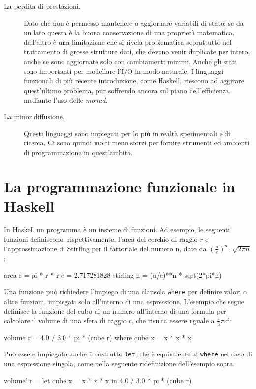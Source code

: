 \begin{description}
    \item[La perdita di prestazioni.] Dato che non \`e permesso 
    mantenere o aggiornare variabili di stato; se da un lato questa \`e la 
    buona conservazione di una propriet\`a matematica, dall'altro \`e una 
    limitazione che si rivela problematica soprattutto nel trattamento di 
    grosse strutture dati, che devono venir duplicate per intero, anche se 
    sono aggiornate solo con cambiamenti minimi. Anche gli stati sono 
    importanti per modellare l'I/O in modo naturale. I linguaggi funzionali di 
    pi\`u recente introduzione, come Haskell, riescono ad aggirare 
    quest'ultimo problema, pur soffrendo ancora sul piano dell'efficienza, mediante l'uso delle \emph{monad}.

    \item[La minor diffusione.] Questi linguaggi sono impiegati per lo pi\`u in realt\`a sperimentali e di 
    ricerca. Ci sono quindi molti meno sforzi per fornire strumenti ed ambienti di 
    programmazione in quest'ambito.
\end{description}

\section{La programmazione funzionale in Haskell}

In Haskell un programma \`e un insieme di funzioni. Ad esempio, le 
seguenti funzioni definiscono, rispettivamente, l'area del cerchio di 
raggio $r$ e l'approssimazione di Stirling per il fattoriale del numero 
n, dato da $(\frac{n}{e})^{n}\cdot\sqrt{2\pi n}$:
\begin{haskellCode}
area r     = pi * r * r
e          = 2.717281828
stirling n = (n/e)**n * sqrt(2*pi*n)
\end{haskellCode}



Una funzione pu\`o richiedere l'impiego di una clausola \verb"where" per 
definire valori o altre funzioni, impiegati solo all'interno di una 
espressione. L'esempio che segue definisce la funzione del cubo di un 
numero all'interno di una formula per calcolare il volume di una sfera di 
raggio $r$, che risulta essere uguale a $\frac{4}{3}\pi r^{3}$:
\begin{haskellCode}
volume r    =  4.0 / 3.0 * pi * (cube r)
	where
		cube x  =  x * x * x
\end{haskellCode}
Pu\`o essere impiegato anche il costrutto \verb"let", che \`e equivalente 
al \verb"where" nel caso di una espressione singola, come nella seguente 
ridefinizione dell'esempio sopra.
\begin{haskellCode}
volume' r  = let
	cube x  =  x * x * x
		in 4.0 / 3.0 * pi * (cube r)
\end{haskellCode}

